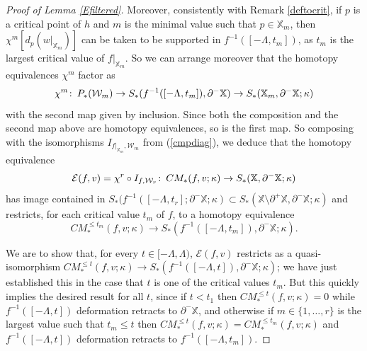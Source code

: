 \documentclass[11pt]{amsart}
\theoremstyle{definition}
\theoremstyle{remark}
\numberwithin{equation}{section}
\def\co{\colon\thinspace}
\begin{document}
\begin{proof}[Proof of Lemma \ref{Efiltered}]
	Moreover, consistently with Remark \ref{deftocrit}, if $p$ is a critical point of $h$ and $m$ is the minimal value such that $p\in \mathbb{X}_m$, then  $\chi^{m}[d_p(w|_{\mathbb{X}_m})]$ can be taken to be supported in $f^{-1}([-\Lambda,t_m])$, as $t_m$ is the largest critical value of $f|_{\mathbb{X}_m}$.  So we can arrange moreover that the homotopy equivalences $\chi^{m}$ factor as \[ \chi^{m}\co P_*(\mathcal{W}_m)\to   S_{*}(f^{-1}([-\Lambda,t_m]),\partial^-\mathbb{X})\to S_{*}(\mathbb{X}_m,\partial^-\mathbb{X};\kappa)  \] with the second map given by inclusion.  Since both the composition and the second map above are homotopy equivalences, so is the first map.  So composing with the isomorphisms $I_{f|_{\mathbb{X}_m},\mathcal{W}_m}$ from (\ref{cmpdiag}), we deduce that the homotopy equivalence \[ \mathcal{E}(f,v)=\chi^{r}\circ I_{f,\mathcal{W}_r}\co CM_*(f,v;\kappa)\to S_*(\mathbb{X},\partial^-\mathbb{X};\kappa) \] has image contained in $S_*(f^{-1}([-\Lambda,t_r];\partial^-\mathbb{X};\kappa)\subset S_*(\mathbb{X}\setminus\partial^+\mathbb{X},\partial^-\mathbb{X};\kappa)$ and restricts, for each critical value $t_m$ of $f$, to a homotopy equivalence \[ CM_{*}^{\leq t_m}(f,v;\kappa)\to S_{*}(f^{-1}([-\Lambda,t_m]),\partial^-\mathbb{X};\kappa).\]
	
	We are to show that, for every $t\in [-\Lambda,\Lambda)$, $\mathcal{E}(f,v)$ restricts as a quasi-isomorphism $CM_{*}^{\leq t}(f,v;\kappa)\to S_{*}(f^{-1}([-\Lambda,t]),\partial^-\mathbb{X};\kappa)$; we have just established this in the case that $t$ is one of the critical values $t_m$.  But this quickly implies the desired result for all $t$, since if $t<t_1$ then $CM_{*}^{\leq t}(f,v;\kappa)=0$ while $f^{-1}([-\Lambda,t])$ deformation retracts to $\partial^-\mathbb{X}$, and otherwise if $m\in\{1,\ldots,r\}$ is the largest value such that $t_m\leq t$ then $CM_{*}^{\leq t}(f,v;\kappa)=CM_{*}^{\leq t_m}(f,v;\kappa)$ and $f^{-1}([-\Lambda,t])$ deformation retracts to $f^{-1}([-\Lambda,t_m])$. 
\end{proof}
\end{document}

